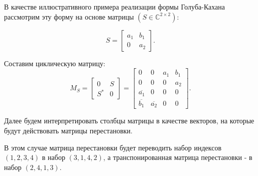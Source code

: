 \begin{example}
    В качестве иллюстративного примера реализации формы Голуба-Кахана рассмотрим эту форму на основе матрицы $(S\in \mathbb{C}^{2\times2})$:

\[
    S=\begin{bmatrix} a_1 & b_1 \\ 0 & a_2 \end{bmatrix}.
\]

Составим циклическую матрицу:
\[
    M_S=\begin{bmatrix}
        0 & S \\
        S^* & 0
    \end{bmatrix}=\begin{bmatrix} 0 & 0& a_1 & b_1 \\ 0 & 0 & 0 & a_2 \\ \overline{a_1} & 0 & 0 & 0 \\ \overline{b_1} & \overline{a_2} & 0 & 0  \end{bmatrix}.
\]

Далее будем интерпретировать столбцы матрицы в качестве векторов, на которые будут действовать матрицы перестановки.

\begin{note}
    В этом случае матрица перестановки будет переводить набор индексов $(1,2,3,4)$ в набор $(3,1,4,2)$, а транспонированная матрица перестановки - в набор $(2,4,1,3)$.
\end{note}


\end{example}
